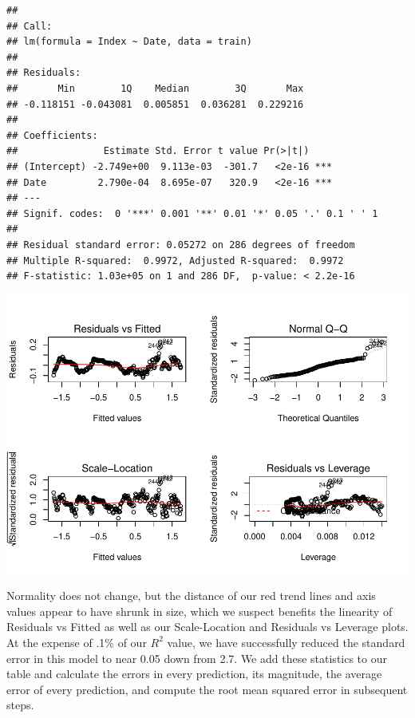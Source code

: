 \documentclass[
]{article}
\begin{document}
\begin{verbatim}
## 
## Call:
## lm(formula = Index ~ Date, data = train)
## 
## Residuals:
##       Min        1Q    Median        3Q       Max 
## -0.118151 -0.043081  0.005851  0.036281  0.229216 
## 
## Coefficients:
##               Estimate Std. Error t value Pr(>|t|)    
## (Intercept) -2.749e+00  9.113e-03  -301.7   <2e-16 ***
## Date         2.790e-04  8.695e-07   320.9   <2e-16 ***
## ---
## Signif. codes:  0 '***' 0.001 '**' 0.01 '*' 0.05 '.' 0.1 ' ' 1
## 
## Residual standard error: 0.05272 on 286 degrees of freedom
## Multiple R-squared:  0.9972, Adjusted R-squared:  0.9972 
## F-statistic: 1.03e+05 on 1 and 286 DF,  p-value: < 2.2e-16
\end{verbatim}

\includegraphics{CPIAnalysis_files/figure-latex/unnamed-chunk-10-1.pdf}

Normality does not change, but the distance of our red trend lines and
axis values appear to have shrunk in size, which we suspect benefits the
linearity of Residuals vs Fitted as well as our Scale-Location and
Residuals vs Leverage plots. At the expense of .1\% of our \(R^2\)
value, we have successfully reduced the standard error in this model to
near 0.05 down from 2.7. We add these statistics to our table and
calculate the errors in every prediction, its magnitude, the average
error of every prediction, and compute the root mean squared error in
subsequent steps.
\end{document}
